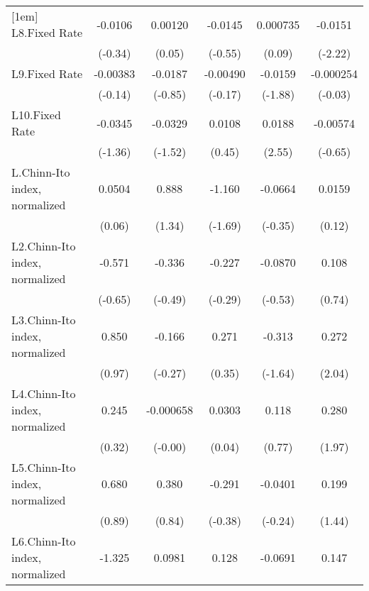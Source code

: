 {\begin{longtable}{l*{5}{c}}
[1em]
L8.Fixed Rate   &  -0.0106         &  0.00120         &  -0.0145         & 0.000735         &  -0.0151\sym{*}  \\
                &  (-0.34)         &   (0.05)         &  (-0.55)         &   (0.09)         &  (-2.22)         \\
[1em]
L9.Fixed Rate   & -0.00383         &  -0.0187         & -0.00490         &  -0.0159         &-0.000254         \\
                &  (-0.14)         &  (-0.85)         &  (-0.17)         &  (-1.88)         &  (-0.03)         \\
[1em]
L10.Fixed Rate  &  -0.0345         &  -0.0329         &   0.0108         &   0.0188\sym{*}  & -0.00574         \\
                &  (-1.36)         &  (-1.52)         &   (0.45)         &   (2.55)         &  (-0.65)         \\
[1em]
L.Chinn-Ito index, normalized&   0.0504         &    0.888         &   -1.160         &  -0.0664         &   0.0159         \\
                &   (0.06)         &   (1.34)         &  (-1.69)         &  (-0.35)         &   (0.12)         \\
[1em]
L2.Chinn-Ito index, normalized&   -0.571         &   -0.336         &   -0.227         &  -0.0870         &    0.108         \\
                &  (-0.65)         &  (-0.49)         &  (-0.29)         &  (-0.53)         &   (0.74)         \\
[1em]
L3.Chinn-Ito index, normalized&    0.850         &   -0.166         &    0.271         &   -0.313         &    0.272\sym{*}  \\
                &   (0.97)         &  (-0.27)         &   (0.35)         &  (-1.64)         &   (2.04)         \\
[1em]
L4.Chinn-Ito index, normalized&    0.245         &-0.000658         &   0.0303         &    0.118         &    0.280         \\
                &   (0.32)         &  (-0.00)         &   (0.04)         &   (0.77)         &   (1.97)         \\
[1em]
L5.Chinn-Ito index, normalized&    0.680         &    0.380         &   -0.291         &  -0.0401         &    0.199         \\
                &   (0.89)         &   (0.84)         &  (-0.38)         &  (-0.24)         &   (1.44)         \\
[1em]
L6.Chinn-Ito index, normalized&   -1.325         &   0.0981         &    0.128         &  -0.0691         &    0.147         \\

\end{longtable}}

